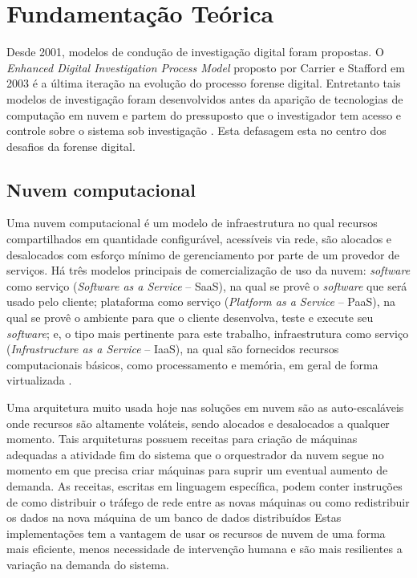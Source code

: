 \chapter{Fundamentação Teórica}
\label{chp:fundamentação}

Desde 2001, modelos de condução de investigação digital foram propostas. 
%
O \textit{Enhanced Digital Investigation Process Model} proposto por Carrier e Stafford em 2003 é a última iteração na evolução do processo forense digital.
%
Entretanto tais modelos de investigação foram desenvolvidos antes da aparição de tecnologias de computação em nuvem e partem do pressuposto que o investigador tem acesso e controle sobre o sistema sob investigação \cite{GrisposChallengesCloudComputing:2012}.
%
Esta defasagem esta no centro dos desafios da forense digital.

\section{Nuvem computacional}
\label{sec:computacaonuvem}

Uma nuvem computacional é um modelo de infraestrutura no qual recursos compartilhados em quantidade configurável, acessíveis via rede, são alocados e desalocados com esforço mínimo de gerenciamento por parte de um provedor de serviços.
%
Há três modelos principais de comercialização de uso da nuvem: \textit{software} como serviço (\textit{Software as a Service} -- SaaS), na qual se provê o \textit{software} que será usado pelo cliente; plataforma como serviço (\textit{Platform as a Service} -- PaaS), na qual se provê o ambiente para que o cliente desenvolva, teste e execute seu \textit{software}; e, o tipo mais pertinente para este trabalho, infraestrutura como serviço (\textit{Infrastructure as a Service} -- IaaS), na qual são fornecidos recursos computacionais básicos, como processamento e memória, em geral de forma virtualizada \cite{NIST2011}.

Uma arquitetura muito usada hoje nas soluções em nuvem são as auto-escaláveis onde recursos são altamente voláteis, sendo alocados e desalocados a qualquer momento. 
%
Tais arquiteturas possuem receitas para criação de máquinas adequadas a atividade fim do sistema que o orquestrador da nuvem segue no momento em que precisa criar máquinas para suprir um eventual aumento de demanda.
%
As receitas, escritas em linguagem específica, podem conter instruções de como distribuir o tráfego de rede entre as novas máquinas ou como redistribuir os dados na nova máquina de um banco de dados distribuídos
%
Estas implementações tem a vantagem de usar os recursos de nuvem de uma forma mais eficiente, menos necessidade de intervenção humana e são mais resilientes a variação na demanda do sistema.


